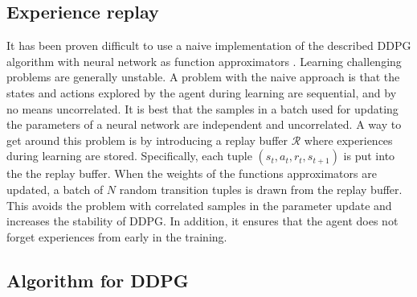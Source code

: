 \documentclass[class=book, crop=false, 11pt]{standalone}
\begin{document}
\subsection{Experience replay}
It has been proven difficult to use a naive implementation of the described DDPG algorithm with neural network as function approximators \cite{DBLP:journals/corr/LillicrapHPHETS15}. Learning challenging problems are generally unstable. A problem with the naive approach is that the states and actions explored by the agent during learning are sequential, and by no means uncorrelated. It is best that the samples in a batch used for updating the parameters of a neural network are independent and uncorrelated. A way to get around this problem is by introducing a replay buffer $\mathcal{R}$ where experiences during learning are stored. Specifically, each tuple $(s_{t},a_{t},r_{t},s_{t+1})$ is put into the the replay buffer. When the weights of the functions approximators are updated, a batch of $N$ random transition tuples is drawn from the replay buffer. This avoids the problem with correlated samples in the parameter update and increases the stability of DDPG. In addition, it ensures that the agent does not forget experiences from early in the training. 

\subsection{Algorithm for DDPG}
\end{document}
